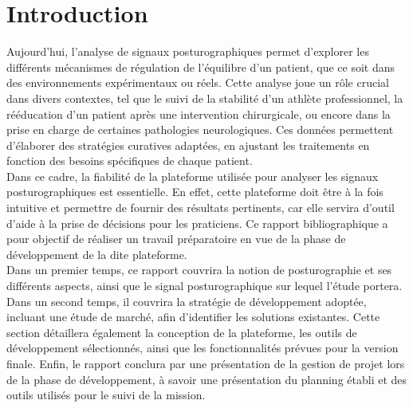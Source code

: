 \section{Introduction}

Aujourd’hui, l’analyse de signaux posturographiques permet d’explorer les différents mécanismes de 
régulation de l’équilibre d’un patient, que ce soit dans des environnements expérimentaux ou réels. 
Cette analyse joue un rôle crucial dans divers contextes, tel que le suivi de la stabilité d’un athlète 
professionnel, la rééducation d’un patient après une intervention chirurgicale, ou encore dans la prise 
en charge de certaines pathologies neurologiques. Ces données permettent d’élaborer des stratégies 
curatives adaptées, en ajustant les traitements en fonction des besoins spécifiques de chaque patient.\\
Dans ce cadre, la fiabilité de la plateforme utilisée pour analyser les signaux posturographiques est 
essentielle. En effet, cette plateforme doit être à la fois intuitive et permettre de fournir des 
résultats pertinents, car elle servira d’outil d’aide à la prise de décisions pour les praticiens. 
Ce rapport bibliographique a pour objectif de réaliser un travail préparatoire en vue de la phase de 
développement de la dite plateforme.\\
Dans un premier temps, ce rapport couvrira la notion de posturographie et ses différents aspects, 
ainsi que le signal posturographique sur lequel l’étude portera. Dans un second temps, il couvrira la 
stratégie de développement adoptée, incluant une étude de marché, afin d'identifier les solutions 
existantes.  Cette section détaillera également la conception de la plateforme, les outils de 
développement sélectionnés, ainsi que les fonctionnalités prévues pour la version finale. Enfin, 
le rapport conclura par une présentation de la gestion de projet lors de la phase de développement, 
à savoir une présentation du planning établi et des outils utilisés pour le suivi de la mission.
